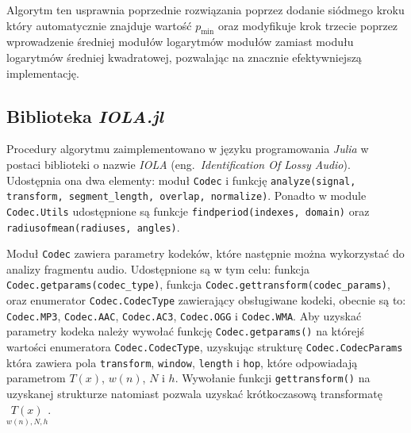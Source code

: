 \documentclass[pl,12pt]{aghdpl}
\let\Oldsubsection\subsection%
\renewcommand{\subsection}{\FloatBarrier\Oldsubsection}
\begin{document}
Algorytm ten usprawnia poprzednie rozwiązania poprzez dodanie siódmego kroku
który automatycznie znajduje wartość $p_{\min}$ oraz modyfikuje krok trzecie
poprzez wprowadzenie średniej modułów logarytmów modułów zamiast modułu
logarytmów średniej kwadratowej, pozwalając na znacznie efektywniejszą
implementację.
\subsection{Biblioteka \textit{IOLA.jl}}
Procedury algorytmu zaimplementowano w języku programowania \textit{Julia} w
postaci biblioteki o nazwie \textit{IOLA} (eng.\ \textit{Identification Of
Lossy Audio}). Udostępnia ona dwa elementy: moduł \lstinline|Codec| i funkcję
\lstinline|analyze(signal, transform, segment_length, overlap, normalize)|.
Ponadto w module \lstinline|Codec.Utils| udostępnione są funkcje
\lstinline|findperiod(indexes, domain)| oraz
\lstinline|radiusofmean(radiuses, angles)|.

Moduł \lstinline|Codec| zawiera parametry kodeków, które następnie można
wykorzystać do analizy fragmentu audio. Udostępnione są w tym celu: funkcja
\lstinline|Codec.getparams(codec_type)|, funkcja
\lstinline|Codec.gettransform(codec_params)|, oraz enumerator
\lstinline|Codec.CodecType| zawierający obsługiwane kodeki, obecnie są to:
\lstinline|Codec.MP3|, \lstinline|Codec.AAC|, \lstinline|Codec.AC3|,
\lstinline|Codec.OGG| i \lstinline|Codec.WMA|. Aby uzyskać parametry kodeka
należy wywołać funkcję \lstinline|Codec.getparams()| na którejś wartości
enumeratora \lstinline|Codec.CodecType|, uzyskując strukturę
\lstinline|Codec.CodecParams| która zawiera pola \lstinline|transform|,
\lstinline|window|, \lstinline|length| i \lstinline|hop|, które odpowiadają
parametrom $T(x)$, $w(n)$, $N$ i $h$. Wywołanie funkcji
\lstinline|gettransform()| na uzyskanej strukturze natomiast pozwala uzyskać
krótkoczasową transformatę $\underset{w(n),N,h}{T(x)}$.
\end{document}
